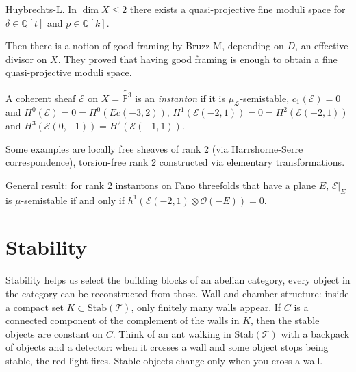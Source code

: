 \noindent
Huybrechts-L. In $\dim X\leq 2$
there exists a quasi-projective fine moduli
space
for $\delta \in \mathbb{Q}[t]$ and $p \in
\mathbb{Q}[k]$.

\medskip\noindent
Then there is a notion of good framing by
Bruzz-M,
depending on $D$, an effective divisor on
$X$.
They proved that having good framing is
enough
to obtain a fine quasi-projective moduli
space.

\begin{definition}
\label{definition-instanton}
A coherent sheaf $\mathcal{E}$ on
$X=\tilde{\mathbb{P}^3}$
is an {\it instanton} if it is
$\mu_{\mathcal{L}}$-semistable,
$c_1(\mathcal{E})=0$ and
$H^0(\mathcal{E})=0=H^0(Ec(-3,2))$,
$H^1(\mathcal{E}(-2,1))=0=H^2(\mathcal{E}(-2,
1))$
and
$H^3(\mathcal{E}(0,-1))=H^2(\mathcal{E}(-1,1)
)$.
\end{definition}

\noindent
Some examples are locally free sheaves of
rank 2 (via Harrshorne-Serre
correspondence),
torsion-free rank 2 constructed via
elementary
transformations.

\medskip\noindent
General result: for rank 2 instantons on Fano
threefolds
that have a plane $E$,
$\mathcal{E}|_{E}$ is $\mu$-semistable
if and only if $h^1(\mathcal{E}(-2,1) \otimes
\mathcal{O}(-E))=0$.




\section{Stability}
\label{section-stability}

\noindent
Stability helps us select the
building blocks of an abelian
category, every object in the
category can be reconstructed
from those.
Wall and chamber structure: inside a
compact set $K \subset
\text{Stab}(\mathcal{T})$,
only finitely many walls appear.
If $C$ is a connected component of
the complement of the walls in $K$,
then the stable objects are constant
on $C$.
Think of an ant walking in
$\text{Stab}(\mathcal{T})$ with a
backpack of objects and a detector:
when it crosses a wall and some object
stops being stable, the red light fires.
Stable objects change only when you
cross a wall.

